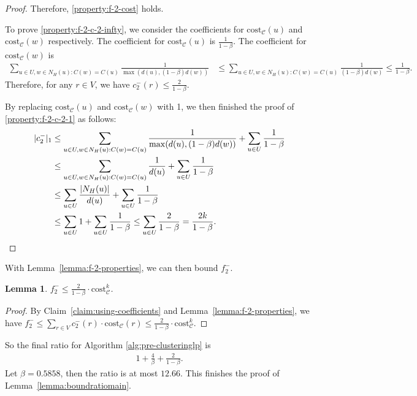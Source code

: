 \documentclass[11pt]{article}
\newcommand{\cost}{\mathrm{cost}}
\newtheorem{lemma}[theorem]{Lemma}
\newcommand{\calC}{{\mathcal{C}}}
\begin{document}
\begin{CJK*}{UTF8}{gbsn}
\begin{proof}
Therefore, \ref{property:f-2-cost} holds.

To prove \ref{property:f-2-c-2-infty}, we consider the coefficients for $\cost_\calC(u)$ and $\cost_\calC(w)$ respectively.
The coefficient for $\cost_\calC(u)$ is $\frac{1}{1-\beta}$.
The coefficient for $\cost_\calC(w)$ is
\begin{align*}
    \sum_{u \in U,w \in N_H(u):C(w) = C(u)} \frac{1}{\max(d(u), (1-\beta) d(w))} &\leq \sum_{u \in U,w \in N_H(u):C(w) = C(u)} \frac{1}{(1-\beta) d(w)} \leq \frac{1}{1-\beta}.
\end{align*}
Therefore, for any $r\in V$, we have $c^-_2(r)\le \frac{2}{1-\beta}$.

By replacing $\cost_\calC(u)$ and $\cost_\calC(w)$ with 1, we then finished the proof of \ref{property:f-2-c-2-1} as follows:
\begin{align*}
    |c^-_2|_1 &\leq \sum_{u \in U,w \in N_H(u):C(w) = C(u)} \frac{1}{\max(d(u), (1-\beta) d(w))} + \sum_{u \in U} \frac{1}{1-\beta}\\
    &\leq \sum_{u \in U,w \in N_H(u):C(w) = C(u)} \frac{1}{d(u)} + \sum_{u \in U} \frac{1}{1-\beta}\\
    &\leq \sum_{u \in U} \frac{|N_H(u)|}{d(u)} + \sum_{u \in U} \frac{1}{1-\beta}\\
    &\leq \sum_{u \in U} 1 + \sum_{u \in U} \frac{1}{1-\beta}
    \leq \sum_{u \in U} \frac{2}{1-\beta}
    = \frac{2k}{1-\beta}.  \qedhere
\end{align*}

\end{proof}

With Lemma~\ref{lemma:f-2-properties}, we can then bound $f^-_2$.

\begin{lemma}
    $f^-_2 \leq \frac{2}{1-\beta} \cdot \cost^k_\calC$.
\end{lemma}
\begin{proof}
    By Claim~\ref{claim:using-coefficients} and Lemma~\ref{lemma:f-2-properties}, we have $f^-_2\le \sum_{r\in V}c^-_2(r) \cdot \cost_\calC(r)\le \frac{2}{1-\beta} \cdot \cost^k_\calC$.
\end{proof}

So the final ratio for Algorithm \ref{alg:pre-clusteringlp} is 
\begin{align*}
1 + \frac4\beta + \frac2{1-\beta}.
\end{align*} 
Let $\beta = 0.5858$, then the ratio is at most $12.66$.  This finishes the proof of Lemma~\ref{lemma:boundratiomain}.






\end{CJK*}
\end{document}
